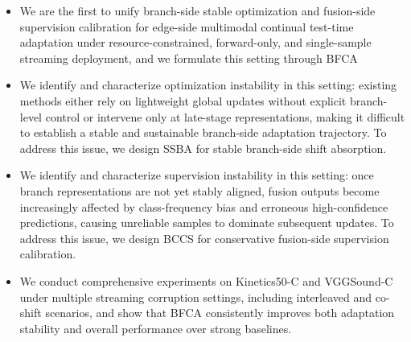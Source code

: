 \begin{itemize}
    \item We are the first to unify branch-side stable optimization and fusion-side supervision calibration for edge-side multimodal continual test-time adaptation under resource-constrained, forward-only, and single-sample streaming deployment, and we formulate this setting through BFCA
    \item We identify and characterize optimization instability in this setting: existing methods either rely on lightweight global updates without explicit branch-level control or intervene only at late-stage representations, making it difficult to establish a stable and sustainable branch-side adaptation trajectory. To address this issue, we design SSBA for stable branch-side shift absorption.
    \item We identify and characterize supervision instability in this setting: once branch representations are not yet stably aligned, fusion outputs become increasingly affected by class-frequency bias and erroneous high-confidence predictions, causing unreliable samples to dominate subsequent updates. To address this issue, we design BCCS for conservative fusion-side supervision calibration.
    \item We conduct comprehensive experiments on Kinetics50-C and VGGSound-C under multiple streaming corruption settings, including interleaved and co-shift scenarios, and show that BFCA consistently improves both adaptation stability and overall performance over strong baselines.
\end{itemize}
